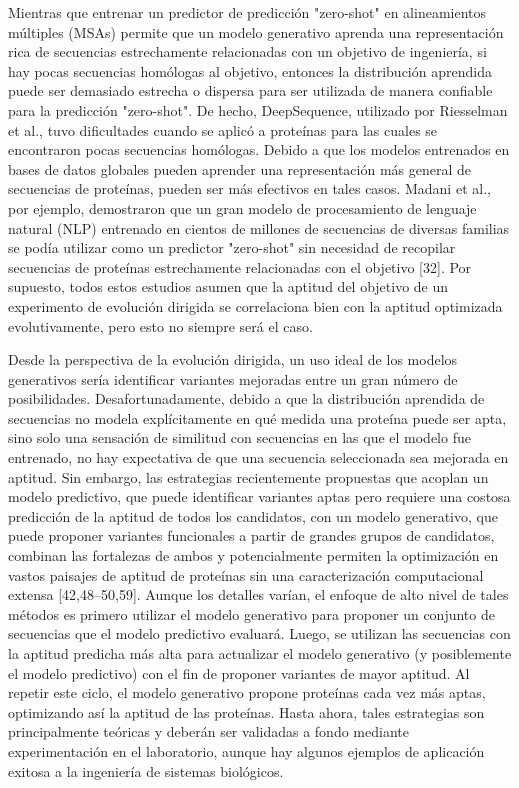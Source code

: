 \documentclass[12pt]{article}
\begin{document}
Mientras que entrenar un predictor de predicción "zero-shot" en alineamientos múltiples (MSAs) permite que un modelo generativo aprenda una representación rica de secuencias estrechamente relacionadas con un objetivo de ingeniería, si hay pocas secuencias homólogas al objetivo, entonces la distribución aprendida puede ser demasiado estrecha o dispersa para ser utilizada de manera confiable para la predicción "zero-shot". De hecho, DeepSequence, utilizado por Riesselman et al., tuvo dificultades cuando se aplicó a proteínas para las cuales se encontraron pocas secuencias homólogas. Debido a que los modelos entrenados en bases de datos globales pueden aprender una representación más general de secuencias de proteínas, pueden ser más efectivos en tales casos. Madani et al., por ejemplo, demostraron que un gran modelo de procesamiento de lenguaje natural (NLP) entrenado en cientos de millones de secuencias de diversas familias se podía utilizar como un predictor "zero-shot" sin necesidad de recopilar secuencias de proteínas estrechamente relacionadas con el objetivo [32]. Por supuesto, todos estos estudios asumen que la aptitud del objetivo de un experimento de evolución dirigida se correlaciona bien con la aptitud optimizada evolutivamente, pero esto no siempre será el caso.

Desde la perspectiva de la evolución dirigida, un uso ideal de los modelos generativos sería identificar variantes mejoradas entre un gran número de posibilidades. Desafortunadamente, debido a que la distribución aprendida de secuencias no modela explícitamente en qué medida una proteína puede ser apta, sino solo una sensación de similitud con secuencias en las que el modelo fue entrenado, no hay expectativa de que una secuencia seleccionada sea mejorada en aptitud. Sin embargo, las estrategias recientemente propuestas que acoplan un modelo predictivo, que puede identificar variantes aptas pero requiere una costosa predicción de la aptitud de todos los candidatos, con un modelo generativo, que puede proponer variantes funcionales a partir de grandes grupos de candidatos, combinan las fortalezas de ambos y potencialmente permiten la optimización en vastos paisajes de aptitud de proteínas sin una caracterización computacional extensa [42,48–50,59]. Aunque los detalles varían, el enfoque de alto nivel de tales métodos es primero utilizar el modelo generativo para proponer un conjunto de secuencias que el modelo predictivo evaluará. Luego, se utilizan las secuencias con la aptitud predicha más alta para actualizar el modelo generativo (y posiblemente el modelo predictivo) con el fin de proponer variantes de mayor aptitud. Al repetir este ciclo, el modelo generativo propone proteínas cada vez más aptas, optimizando así la aptitud de las proteínas. Hasta ahora, tales estrategias son principalmente teóricas y deberán ser validadas a fondo mediante experimentación en el laboratorio, aunque hay algunos ejemplos de aplicación exitosa a la ingeniería de sistemas biológicos.
\end{document}
